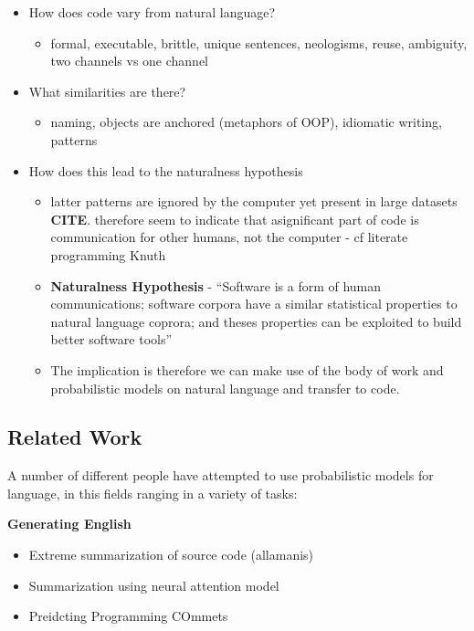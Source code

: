 \begin{itemize}
    \item How does code vary from natural language?
        \begin{itemize}
            \item formal, executable, brittle, unique sentences, neologisms, reuse, ambiguity, two channels vs one channel
        \end{itemize}
    \item What similarities are there?
        \begin{itemize}
            \item naming, objects are anchored (metaphors of OOP), idiomatic writing, patterns
        \end{itemize}
    \item How does this lead to the naturalness hypothesis
        \begin{itemize}
            \item latter patterns are ignored by the computer yet present in large datasets \textbf{CITE}. 
            therefore seem to indicate that asignificant part of code is communication for other humans, not the computer - cf literate programming Knuth
            \item \textbf{Naturalness Hypothesis} - ``Software is a form of human communications; software corpora have a similar statistical properties to natural language coprora; and theses properties can be exploited to build better software tools'' 
            \item The implication is therefore we can make use of the body of work and probabilistic models on natural language and transfer to code.
        \end{itemize}
\end{itemize}


\subsection{Related Work} %
\label{ssub:related work}

A number of different people have attempted to use probabilistic models for language, in this fields ranging in a variety of tasks:

\textbf{Generating English}
\begin{itemize}
    \item Extreme summarization of source code (allamanis)
    \item Summarization using neural attention model
    \item Preidcting Programming COmmets
\end{itemize}

